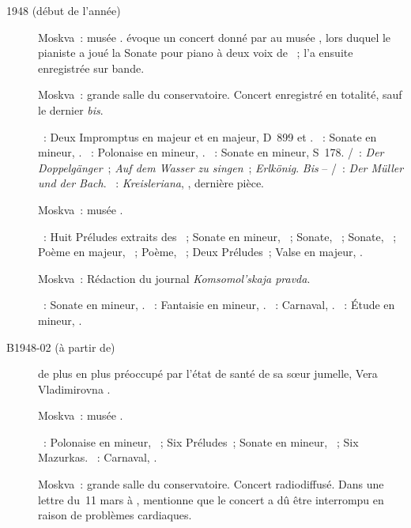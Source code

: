 \begin{description}
 \item[1948 (début de l'année)]
 Moskva~: musée \Scriabine{}.
 \citet{Bogdanov67a} évoque un concert donné par \VSofronitsky{} au musée
 \Scriabine{}, lors duquel le pianiste a joué la Sonate pour piano à deux
 voix de \VBogdanovBerezovsky{}~; \Sofronitsky{} l'a ensuite enregistrée sur
 bande.
 \item[]
 Moskva~: grande salle du conservatoire.
 Concert enregistré en totalité, sauf le dernier \emph{bis}.

 \textsc{\Schubert{}}~: Deux Impromptus en \kG \Flat majeur et en \kA \Flat
 majeur, D~899  et .
 \textsc{\Schumann{}}~: Sonate en \kF \Sharp mineur, .
 \textsc{\Chopin{}}~: Polonaise en \kF \Sharp mineur, .
 \textsc{\Liszt{}}~: Sonate en \kB mineur, S~178.
 \textsc{\Schubert{}/\Liszt{}}~: \emph{Der Doppelgänger}~; \emph{Auf dem
 Wasser zu singen}~; \emph{Erlkönig}.
 \emph{Bis} -- \textsc{\Schubert{}/\Liszt{}}~: \emph{Der Müller und der
 Bach}.
 \textsc{\Schumann{}}~: \emph{Kreisleriana}, , dernière pièce.
 \item[]
 Moskva~: musée \Scriabine{}.

 \textsc{\Scriabine{}}~: Huit Préludes extraits des ~; Sonate en \kF \Sharp mineur, ~; Sonate, ~;
 Sonate, ~; Poème en \kF \Sharp majeur,  ~;
 Poème,  ~; Deux Préludes~; Valse en \kA \Flat majeur,
 .
 \item[]
 Moskva~: Rédaction du journal \emph{Komsomol'skaja pravda}.

 \textsc{\Beethoven{}}~: Sonate en \kF mineur, .
 \textsc{\Chopin{}}~: Fantaisie en \kF mineur, .
 \textsc{\Schumann{}}~: Carnaval, .
 \textsc{\Scriabine{}}~: Étude en \kD \Sharp mineur,  .
 \item[B1948-02 (à partir de)]
 \VSofronitsky{} de plus en plus préoccupé par l'état de santé de sa sœur
 jumelle, Vera Vladimirovna \citep[p.~168]{Nekrasova08}.
 \item[]
 Moskva~: musée \Scriabine{}.

 \textsc{\Chopin{}}~: Polonaise en \kC \Sharp mineur,  ~;
 Six Préludes~; Sonate en \kB \Flat mineur, ~; Six Mazurkas.
 \textsc{\Schumann{}}~: Carnaval, .
 \item[]
 Moskva~: grande salle du conservatoire.
 Concert radiodiffusé.
 Dans une lettre du~11 mars à \AVizel{} \citep[voir][p.~168]{Nekrasova08},
 \VSofronitsky{} mentionne que le concert a dû être interrompu en raison de
 problèmes cardiaques.


\end{description}
